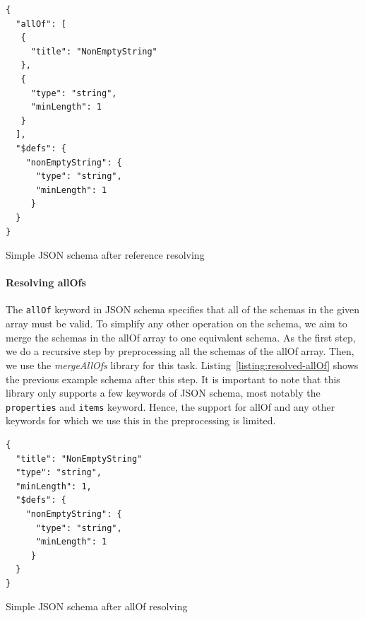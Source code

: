 \begin{listing}[!h]
    \begin{verbatim}
{
  "allOf": [
   {
     "title": "NonEmptyString"
   },
   {
     "type": "string",
     "minLength": 1
   }
  ],
  "$defs": {
    "nonEmptyString": {
      "type": "string",
      "minLength": 1
     }
  }
}
    \end{verbatim}
    \caption{Simple JSON schema after reference resolving}
    \label{listing:reference-resolving}
\end{listing}

\paragraph{Resolving allOfs}

The \texttt{allOf} keyword in JSON schema specifies that all of the schemas in the given array must be valid.
To simplify any other operation on the schema, we aim to merge the schemas in the allOf array to one equivalent schema.
As the first step, we do a recursive step by preprocessing all the schemas of the allOf array.
Then, we use the \textit{mergeAllOfs} library %
for this task.
Listing~\ref{listing:resolved-allOf} shows the previous example schema after this step.
It is important to note that this library only supports a few keywords of JSON schema, most notably the
\texttt{properties} and \texttt{items} keyword.
Hence, the support for allOf and any other keywords for which we use this in the preprocessing is limited.

\begin{listing}[h]
    \begin{verbatim}
{
  "title": "NonEmptyString"
  "type": "string",
  "minLength": 1,
  "$defs": {
    "nonEmptyString": {
      "type": "string",
      "minLength": 1
     }
  }
}
    \end{verbatim}
    \caption{Simple JSON schema after allOf resolving}
    \label{listing:resolved-allOf}
\end{listing}



